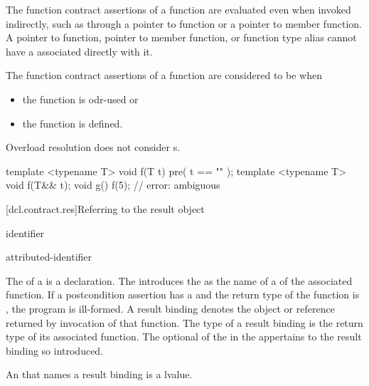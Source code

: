 \pnum
\begin{note}
The function contract assertions of a function
are evaluated even when invoked indirectly,
such as through a pointer to function or a pointer to member function.
A pointer to function,
pointer to member function,
or function type alias
cannot have a 
associated directly with it.
\end{note}

\pnum
The function contract assertions of a function
are considered to be  when
\begin{itemize}
\item
the function is odr-used or
\item
the function is defined.
\end{itemize}
\begin{note}
Overload resolution does not consider
s.
\begin{example}
\begin{codeblock}
template <typename T>  void f(T t) pre( t == "" );
template <typename T>  void f(T&& t);
void g()
{
  f(5);     // error: ambiguous
}
\end{codeblock}
\end{example}
\end{note}


[dcl.contract.res]{Referring to the result object}

\begin{bnf}
\br
  identifier 
\end{bnf}

\begin{bnf}
\br
  attributed-identifier \terminal{:}
\end{bnf}

\pnum
The 
of a 
is a declaration.
The 
introduces the 
as the name of a 
of the associated function.
If a postcondition assertion has a 
and the return type of the function is \cv{} ,
the program is ill-formed.
A result binding denotes
the object or reference returned by
invocation of that function.
The type of a result binding
is the return type of its associated function.
The optional 
of the 
in the 
appertains to the result binding so introduced.
\begin{note}
An 
that names a result binding is a  lvalue.
\end{note}

